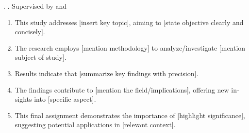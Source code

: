 \begin{otherlanguage}{english}
\itshape
\vspace{20pt}

\noindent
\MakeUppercase{\NamaPenulisInggris}. \JudulSkripsiInggris\unskip. Supervised by
\MakeUppercase{\NamaPembimbingSatu} and \MakeUppercase{\NamaPembimbingDua}

\begin{enumerate}[leftmargin=0.5cm,labelwidth=0.25cm,labelsep=0.25cm,
  align=left,itemsep=0pt,parsep=0pt,topsep=7pt,partopsep=0pt]
  \item This study addresses [insert key topic], aiming to [state objective
    clearly and concisely].
  \item The research employs [mention methodology] to analyze/investigate
    [mention subject of study].
  \item Results indicate that [summarize key findings with precision].
  \item The findings contribute to [mention the field/implications], offering
    new insights into [specific aspect].
  \item This final assignment demonstrates the importance of [highlight
    significance], suggesting potential applications in [relevant context].
\end{enumerate}
\end{otherlanguage}
